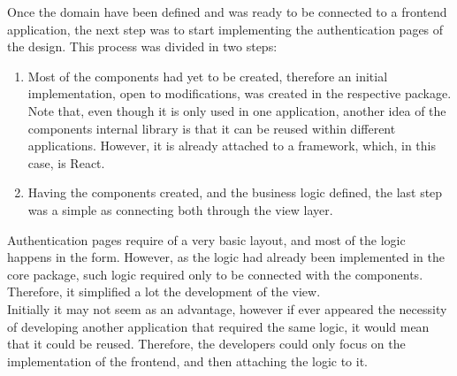 \documentclass[../memory.tex]{subfiles}
\begin{document}
Once the domain have been defined and was ready to be connected to a frontend
application, the next step was to start implementing the authentication pages of
the design. This process was divided in two steps:
\begin{enumerate}[label = \arabic{*}.]
	\item Most of the components had yet to be created, therefore an initial
	      implementation, open to modifications, was created in the respective
	      package. Note that, even though it is only used in one application, another
	      idea of the components internal library is that it can be reused within
	      different applications. However, it is already attached to a framework,
	      which, in this case, is React.
	\item Having the components created, and the business logic defined, the last
	      step was a simple as connecting both through the view layer.
\end{enumerate}
Authentication pages require of a very basic layout, and most of the logic
happens in the form. However, as the logic had already been implemented in the
core package, such logic required only to be connected with the components.
Therefore, it simplified a lot the development of the view.
\\[8pt]
Initially it may not seem as an advantage, however if ever appeared the
necessity of developing another application that required the same logic, it
would mean that it could be reused. Therefore, the developers could only focus
on the implementation of the frontend, and then attaching the logic to it.
\end{document}
